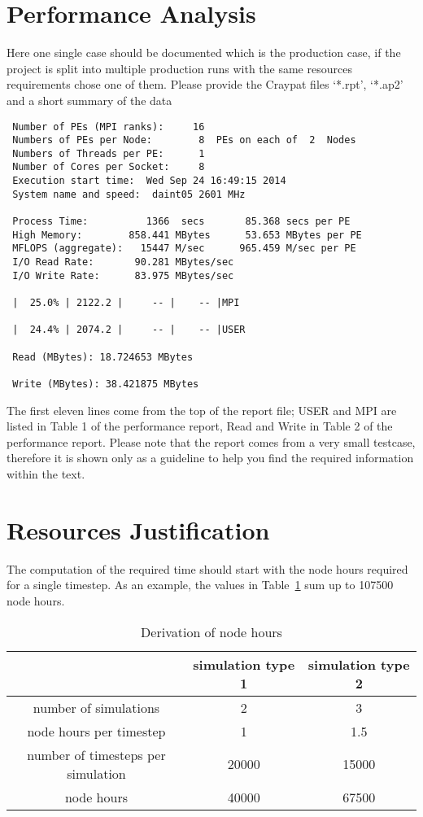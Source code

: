 \documentclass[11pt]{article}
\begin{document}
\section{Performance Analysis}
Here one single case should be documented which is the production case, if the project is split into multiple production runs with the same resources requirements chose one of them. Please provide the Craypat files `*.rpt', `*.ap2' and a short summary of the data

\begin{verbatim}
 Number of PEs (MPI ranks):     16
 Numbers of PEs per Node:        8  PEs on each of  2  Nodes
 Numbers of Threads per PE:      1
 Number of Cores per Socket:     8
 Execution start time:  Wed Sep 24 16:49:15 2014
 System name and speed:  daint05 2601 MHz

 Process Time:          1366  secs       85.368 secs per PE
 High Memory:        858.441 MBytes      53.653 MBytes per PE
 MFLOPS (aggregate):   15447 M/sec      965.459 M/sec per PE
 I/O Read Rate:       90.281 MBytes/sec        
 I/O Write Rate:      83.975 MBytes/sec

 |  25.0% | 2122.2 |     -- |    -- |MPI

 |  24.4% | 2074.2 |     -- |    -- |USER

 Read (MBytes): 18.724653 MBytes

 Write (MBytes): 38.421875 MBytes
\end{verbatim}

The first eleven lines come from the top of the report file; USER and MPI are listed in Table 1 of the performance report, Read and Write in Table 2 of the performance report. Please note that the report comes from a very small testcase, therefore it is shown only as a guideline to help you find the required information within the text.

\section{Resources Justification}
The computation of the required time should start with the node hours required for a single timestep.
As an example, the values in Table~\ref{table:derivation_node_hours} sum up to 107500 node hours.
\begin{table}[H]
 \begin{center}
  \begin{tabular}{|c|c|c|}
   \hline
   & simulation type 1 & simulation type 2 \\ 
   \hline
   number of simulations & 2 & 3 \\
   \hline
   node hours per timestep & 1 & 1.5 \\
   \hline
   number of timesteps per simulation & 20000 & 15000 \\
   \hline
   node hours & 40000 & 67500 \\
   \hline
  \end{tabular}
 \end{center}
 \caption{Derivation of node hours}
 \label{table:derivation_node_hours}
\end{table}
\end{document}
